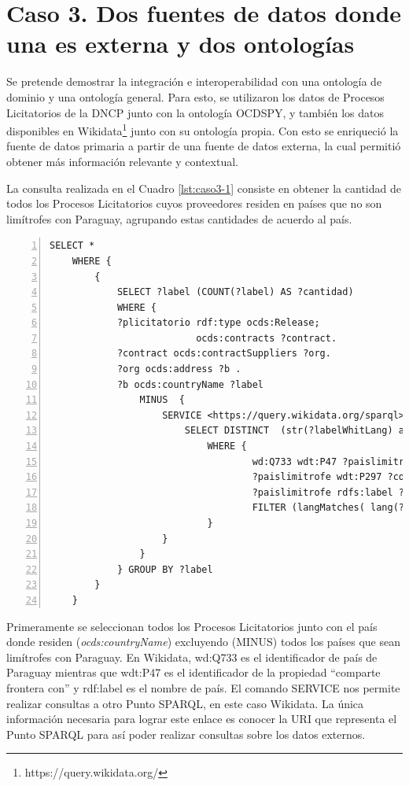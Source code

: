 \section{Caso 3. Dos fuentes de datos donde una es externa y dos ontologías}
\label{section:caso3}
Se pretende demostrar la integración e interoperabilidad con una ontología de dominio y una ontología general. Para esto, se utilizaron los datos de Procesos Licitatorios de la DNCP junto con la ontología OCDSPY, y también los datos disponibles en Wikidata\footnote{https://query.wikidata.org/} junto con su ontología propia. Con esto se enriqueció la fuente de datos primaria a partir de una fuente de datos externa, la cual permitió obtener más información relevante y contextual.

La consulta realizada en el Cuadro  \ref{lst:caso3-1} consiste en obtener la cantidad de todos los Procesos Licitatorios cuyos proveedores residen en países que no son limítrofes con Paraguay, agrupando estas cantidades de acuerdo al país.

\noindent\begin{minipage}[c]{\textwidth}
\begin{lstlisting}[captionpos=b, caption=Integración con una fuente de datos externa utilizando dos ontologías, label=lst:caso3-1,  numbers=left, numberstyle=\tiny\color{mygray},frame=single]
SELECT *
    WHERE {
        {
            SELECT ?label (COUNT(?label) AS ?cantidad)
            WHERE {
            ?plicitatorio rdf:type ocds:Release;
                          ocds:contracts ?contract.
            ?contract ocds:contractSuppliers ?org.
            ?org ocds:address ?b .
            ?b ocds:countryName ?label
                MINUS  { 
                    SERVICE <https://query.wikidata.org/sparql>{ 
                        SELECT DISTINCT  (str(?labelWhitLang) as ?label)
                            WHERE { 
                                    wd:Q733 wdt:P47 ?paislimitrofe .
                                    ?paislimitrofe wdt:P297 ?codigoPais.
                                    ?paislimitrofe rdfs:label ?labelWhitLang.
                                    FILTER (langMatches( lang(?labelWhitLang), "ES") )
                            }        
                    }
                }
            } GROUP BY ?label
        }
    }
 \end{lstlisting}
\end{minipage}

Primeramente se seleccionan todos los Procesos Licitatorios junto con el país donde residen (\textit{ocds:countryName}) excluyendo (MINUS) todos los países que sean limítrofes con Paraguay. En Wikidata, wd:Q733 es el identificador de país de Paraguay mientras que wdt:P47 es el identificador de la propiedad “comparte frontera con” y rdf:label es el nombre de país. El comando SERVICE nos permite realizar consultas a otro Punto SPARQL, en este caso Wikidata. La única información necesaria para lograr este enlace es conocer la URI que representa el Punto SPARQL para así poder realizar consultas sobre los datos externos.


